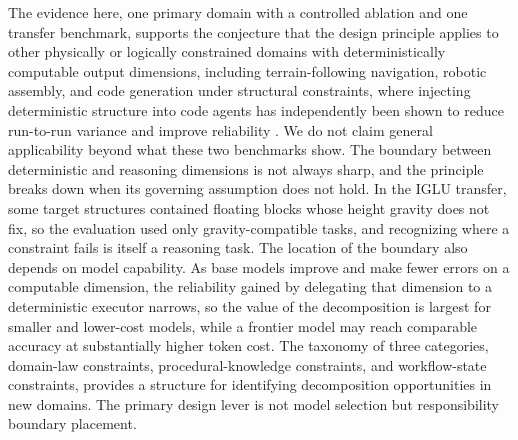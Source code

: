 \documentclass[10pt]{article}
\begin{document}
The evidence here, one primary domain with a controlled ablation and one
transfer benchmark, supports the conjecture that the design principle
applies to other physically or logically constrained domains with
deterministically computable output dimensions, including
terrain-following navigation, robotic assembly, and code generation under
structural constraints, where injecting deterministic structure into code
agents has independently been shown to reduce run-to-run variance and
improve reliability \parencite{lin2026anchoring}. We do not claim general applicability beyond what
these two benchmarks show. The boundary between deterministic and
reasoning dimensions is not always sharp, and the principle breaks down
when its governing assumption does not hold. In the IGLU transfer, some
target structures contained floating blocks whose height gravity does not
fix, so the evaluation used only gravity-compatible tasks, and recognizing
where a constraint fails is itself a reasoning task. The location of the
boundary also depends on model capability. As base models improve and make
fewer errors on a computable dimension, the reliability gained by
delegating that dimension to a deterministic executor narrows, so the
value of the decomposition is largest for smaller and lower-cost models,
while a frontier model may reach comparable accuracy at substantially
higher token cost. The taxonomy of three categories, domain-law constraints,
procedural-knowledge constraints, and workflow-state constraints,
provides a structure for identifying decomposition
opportunities in new domains. The primary design lever is not model
selection but responsibility boundary placement.

\printbibliography[title={References}]
\end{document}
